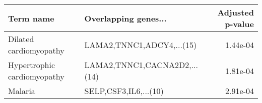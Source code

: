 \begin{tabular}{llr}
\toprule
                  Term name &         Overlapping genes... &  Adjusted p-value \\
\midrule
     Dilated cardiomyopathy &    LAMA2,TNNC1,ADCY4,...(15) &          1.44e-04 \\
Hypertrophic cardiomyopathy & LAMA2,TNNC1,CACNA2D2,...(14) &          1.81e-04 \\
                    Malaria &        SELP,CSF3,IL6,...(10) &          2.91e-04 \\
\bottomrule
\end{tabular}
